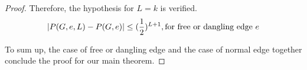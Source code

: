 \begin{proof}
%
%
%
%

		Therefore, the hypothesis for $L=k$ is verified.
		\[\left\vert P(G,e,L) - P(G,e)\right\vert \leq (\frac{1}{2})^{L+1}, \textrm{for free or dangling edge $e$}\]

		
		To sum up, the case of free or dangling edge and the case of normal edge together conclude the proof for our main theorem.
	\end{proof}
